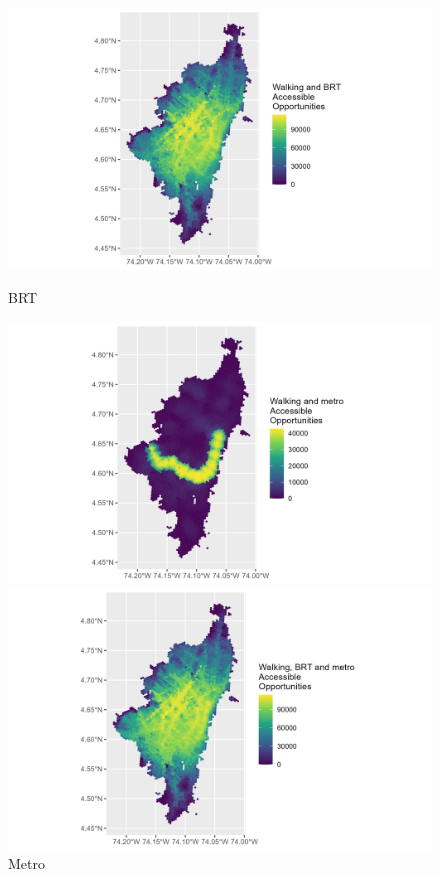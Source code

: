 \documentclass[12pt, a4paper]{report}
\begin{document}
\begin{figure}[H]
    \centering
    \begin{minipage}{0.45\textwidth}
        \centering
        \includegraphics[width=1.3\linewidth]{Data/Results/Images/Access_BRT_base.png}
         \caption{BRT}
        \label{fig:Access_BRT_Base}
    \end{minipage}%
    \hfill
    \begin{minipage}{0.45\textwidth}
        \centering
        \includegraphics[width=1.3\linewidth]{Data/Results/Images/Access_Metro_base.png}
        \caption{Metro}
        \label{fig:Results_Metro_Base}
    \end{minipage}
    \begin{minipage}{0.45\textwidth}
        \centering
        \includegraphics[width=1.3\linewidth]{Data/Results/Images/Access_BRT_Metro_base.png}

\end{minipage}
\end{figure}
\end{document}
